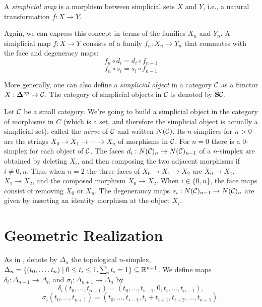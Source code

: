 \documentclass[TFM.tex]{subfiles}
\begin{document}
\begin{defi}
A \emph{simplicial map} is a morphism between simplicial sets $X$ and $Y$, i.e., a natural transformation $f: X\to Y$.
\end{defi}

Again, we can express this concept in terms of the families $X_n$ and $Y_n$. A simiplicial map $f:X\to Y$ consists of a family $f_n:X_n\to Y_n$ that commutes with the face and degeneracy maps:
\[f_n\circ d_i=d_i\circ f_{n+1}\]
\[f_n\circ s_i=s_i\circ f_{n-1}\]

More generally, one can also define a \emph{simplicial object} in a category $\mathcal{C}$ as a functor $X:\mathbf{\Delta}^{op}\to\mathcal{C}$. The category of simplicial objects in $\mathcal{C}$ is denoted by $\mathrm{\mathbf{S}\mathcal{C}}$. 
\begin{ex}
Let $\mathcal{C}$ be a small category. We're going to build a simplicial object in the category of morphisms in $C$ (which is a set, and therefore the simplicial object is actually a simplicial set), called the \emph{nerve} of $\mathcal{C}$ and written $N(\mathcal{C})$. Its $n$-simplices for $n>0$ are the strings $X_0→X_1→\cdots →X_n$ of morphisms in $\mathcal{C}$. For $n=0$ there is a $0$-simplex for each object of $\mathcal{C}$. The faces $d_i:N(\mathcal{C})_n\to N(\mathcal{C})_{n-1}$ of a $n$-simplex are obtained by deleting $X_i$, and then composing the two adjacent morphisms if $i ≠ 0,n$. Thus when $n = 2$ the three faces of
$X_0→X_1→X_2$ are $X_0→X_1$, $X_1→X_2$, and the composed morphism $X_0→X_2$. When $i\in \{0,n\}$, the face maps consist of removing $X_0$ or $X_n$.
The degenerancy maps $s_i:N(\mathcal{C})_{n-1}\to N(\mathcal{C})_n$ are given by inserting an identity morphism at the object $X_i$. 

\end{ex}




\section{Geometric Realization}

As in \cite[Chapter III]{simplicial}, denote by $\Delta_n$ the topological $n$-simplex, $\Delta_n=\{(t_0,\dots, t_n)\mid 0\leq t_i\leq 1, \sum_i t_i=1\}\subseteq\mathbb{R}^{n+1}$. We define maps $\delta_i:\Delta_{n-1}\to\Delta_n$ and $\sigma_i:\Delta_{n+1}\to\Delta_n$ by
\[
\delta_i(t_0,\dots, t_{n-1})=(t_0,\dots, t_{i-1},0,t_i,\dots, t_{n-1}),
\]
\[\sigma_i(t_0,\dots, t_{n+1})=(t_0,\dots, t_{i-1},t_i+t_{i+1},t_{i+2},\dots, t_{n+1}).\]
\end{document}
